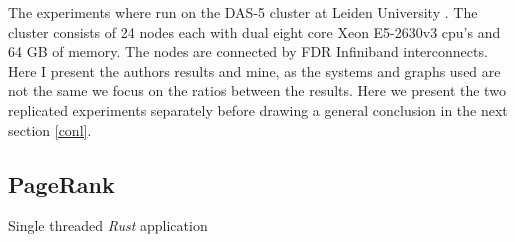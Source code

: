 The experiments where run on the DAS-5 cluster at Leiden University \cite{das5}. The cluster consists of 24 nodes each with dual eight core Xeon E5-2630v3 cpu's and 64 GB of memory. The nodes are connected by FDR Infiniband interconnects. Here I present the authors results and mine, as the systems and graphs used are not the same we focus on the ratios between the results. Here we present the two replicated experiments separately before drawing a general conclusion in the next section \cref{conl}.

\subsection{PageRank}

Single threaded \textit{Rust} application
